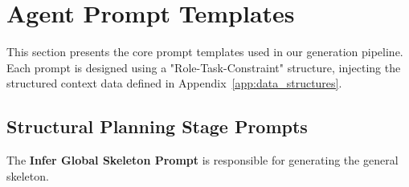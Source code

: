 \section{Agent Prompt Templates}
\label{app:prompts}

This section presents the core prompt templates used in our generation pipeline. Each prompt is designed using a "Role-Task-Constraint" structure, injecting the structured context data defined in Appendix~\ref{app:data_structures}.

\subsection{Structural Planning Stage Prompts}
\label{app:plan_prompt}
The \textbf{Infer Global Skeleton Prompt} is responsible for generating the general skeleton. 
\label{app:plan_prompt_skeleton}
